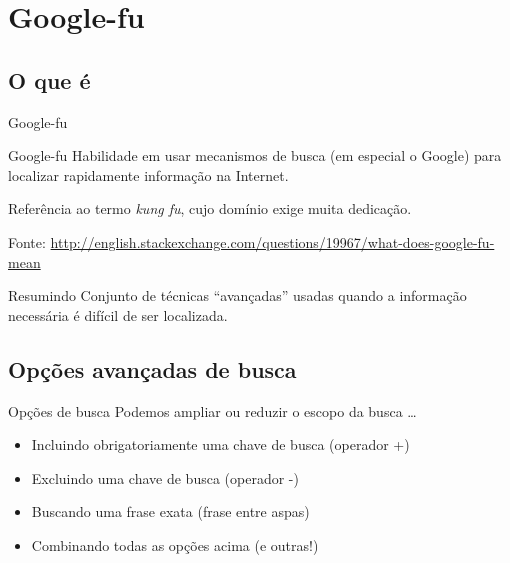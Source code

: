 \documentclass{beamer}
\begin{document}
\section{Google-fu}

\subsection{O que é}

\begin{frame}{Google-fu}
  \begin{block}{Google-fu}
    Habilidade em usar mecanismos de busca (em especial o Google) para
    localizar rapidamente informação na Internet.

    \bigskip
    Referência ao termo {\em kung fu}, cujo domínio exige muita
    dedicação.
  \end{block}
  Fonte: \url{http://english.stackexchange.com/questions/19967/what-does-google-fu-mean}

  \begin{block}{Resumindo}
    Conjunto de técnicas ``avançadas'' usadas quando a informação
    necessária é difícil de ser localizada.
  \end{block}
\end{frame}

\subsection{Opções avançadas de busca}

\begin{frame}{Opções de busca}
  Podemos ampliar ou reduzir o escopo da busca \ldots
  \begin{itemize}
  \item Incluindo obrigatoriamente uma chave de busca (operador +)
  \item Excluindo uma chave de busca (operador -)
  \item Buscando uma frase exata (frase entre aspas)
  \item Combinando todas as opções acima (e outras!)
  \end{itemize}
\end{frame}
\end{document}
